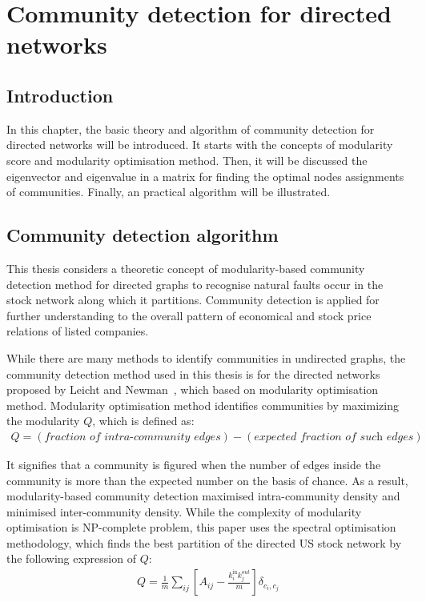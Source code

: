 \chapter{Community detection for directed networks}
\label{cpt:community}
\section{Introduction}
In this chapter, the basic theory and algorithm of community detection for directed networks will be introduced. It starts with the concepts of modularity score and modularity optimisation method. Then, it will be discussed the eigenvector and eigenvalue in a matrix for finding the optimal nodes assignments of communities. Finally, an practical algorithm will be illustrated.

\section{Community detection algorithm}
This thesis considers a theoretic concept of modularity-based community detection method for directed graphs to recognise natural faults occur in the stock network along which it partitions. Community detection is applied for further understanding to the overall pattern of economical and stock price relations of listed companies.

While there are many methods to identify communities in undirected graphs, the community detection method used in this thesis is for the directed networks proposed by Leicht and Newman~\cite{PhysRevLett.100.118703}, which based on modularity optimisation method. Modularity optimisation method identifies communities by maximizing the modularity $Q$, which is defined as:
\begin{eqnarray}
Q=(\textit{fraction of intra-community edges}) - (\textit{expected fraction of such edges})
\end{eqnarray}

It signifies that a community is figured when the number of edges inside the community is more than the expected number on the basis of chance. As a result, modularity-based community detection maximised intra-community density and minimised inter-community density. While the complexity of modularity optimisation is NP-complete problem, this paper uses the spectral optimisation methodology, which finds the best partition of the directed US stock network by the following expression of $Q$:
\begin{eqnarray}
Q=\frac{1}{m}\sum_{ij}{\left[A_{ij}-\frac{k_i^{\text{in}}k_j^{out}}{m}\right]}\delta_{c_i,c_j}
\end{eqnarray}

